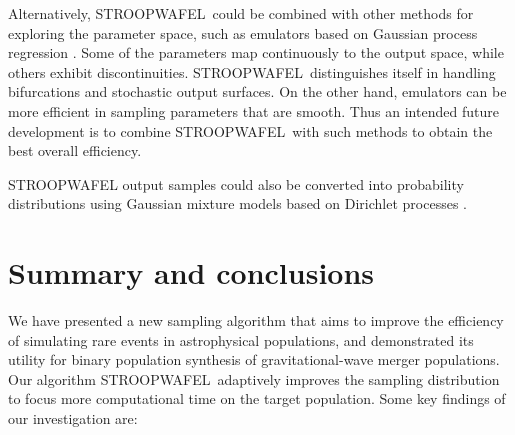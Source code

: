 \documentclass[a4paper,fleqn,usenatbib,useAMS,usedcolumn]{mnras}
\newcommand{\AISs}{\textsc{STROOPWAFEL}}
\begin{document}
Alternatively, \AISs \ could be combined with other methods for exploring the parameter space, such as emulators based on Gaussian process regression \citep[see, e.g.,][]{2017IAUS..325...46B,2018arXiv180608365T}.  Some of the parameters map continuously to the output space, while others exhibit discontinuities.  \AISs \ distinguishes itself in handling bifurcations and stochastic output surfaces. On the other hand, emulators can be more efficient in sampling parameters that are smooth.  
Thus an intended future development is to combine \AISs \ with such methods to obtain the best overall efficiency. 

\AISs{} output samples could also be converted into probability distributions using Gaussian mixture models based on Dirichlet processes \citep{2018MNRAS.479..601D}.  

\section{Summary and conclusions}
\label{sec:conclusion}
We have presented a new sampling algorithm that aims to improve the efficiency of simulating rare events in astrophysical populations, and demonstrated its utility for binary population synthesis of gravitational-wave merger populations.  Our algorithm \AISs \  adaptively improves the sampling distribution to focus more computational time on the target population. Some key findings of our investigation are:
\end{document}
